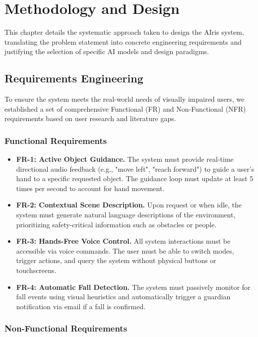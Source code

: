 \documentclass[12pt,a4paper]{report}
\begin{document}
\chapter{Methodology and Design}

This chapter details the systematic approach taken to design the AIris system, translating the problem statement into concrete engineering requirements and justifying the selection of specific AI models and design paradigms.

\section{Requirements Engineering}

To ensure the system meets the real-world needs of visually impaired users, we established a set of comprehensive Functional (FR) and Non-Functional (NFR) requirements based on user research and literature gaps.

\subsection{Functional Requirements}

\begin{itemize}
    \item \textbf{FR-1: Active Object Guidance.} The system must provide real-time directional audio feedback (e.g., "move left", "reach forward") to guide a user's hand to a specific requested object. The guidance loop must update at least 5 times per second to account for hand movement.
    \item \textbf{FR-2: Contextual Scene Description.} Upon request or when idle, the system must generate natural language descriptions of the environment, prioritizing safety-critical information such as obstacles or people.
    \item \textbf{FR-3: Hands-Free Voice Control.} All system interactions must be accessible via voice commands. The user must be able to switch modes, trigger actions, and query the system without physical buttons or touchscreens.
    \item \textbf{FR-4: Automatic Fall Detection.} The system must passively monitor for fall events using visual heuristics and automatically trigger a guardian notification via email if a fall is confirmed.
\end{itemize}

\subsection{Non-Functional Requirements}
\end{document}
